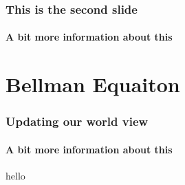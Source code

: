 \documentclass{beamer}
\begin{document}
\begin{frame}
  \frametitle{This is the second slide}
  \framesubtitle{A bit more information about this}
\end{frame}

\section{Bellman Equaiton}
\begin{frame}
  \frametitle{Updating our world view}
  \framesubtitle{A bit more information about this}
  \begin{block}{hello}
    \inputminted[firstline=21, lastline=22, autogobble,breaklines]{python}{../updates.py}
  \end{block}
\end{frame}
\end{document}
